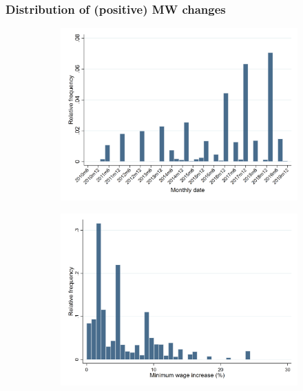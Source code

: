 \documentclass[aspectratio=169, t]{beamer}
\begin{document}
\begin{frame}[label=dist_mw_changes]
    \frametitle{Distribution of (positive) MW changes}

    \vspace{-4mm}
    \begin{figure}
        \begin{subfigure}{0.51\textwidth}
            \vspace{6mm}
            \includegraphics[width = 1.02\textwidth]{estimation_samples/output/pct_ch_mw_date_dist.png}
        \end{subfigure}%
        \begin{subfigure}{0.51\textwidth}
            \includegraphics[width = 1.02\textwidth]{estimation_samples/output/pct_ch_mw_dist.png}
        \end{subfigure}
    \end{figure}
    
    \hyperlink{mw_changes_map}{}
\end{frame}
\end{document}
